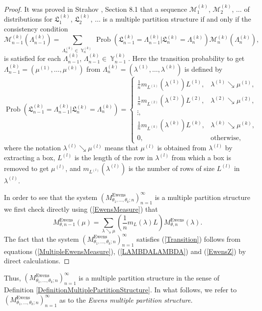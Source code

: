 \documentclass[12pt]{amsart}
\theoremstyle{definition}
\numberwithin{equation}{section}
\DeclareMathOperator{\Prob}{Prob}
\DeclareMathOperator{\Y}{\mathbb{Y}}
\DeclareMathOperator{\Ewens}{Ewens}
\begin{document}
\begin{proof} It was proved in Strahov \cite{StrahovMPS}, Section 8.1
that a sequence $\mathcal{M}_1^{(k)}$, $\mathcal{M}^{(k)}_2$, $\ldots$ of distributions for $\mathfrak{L}_1^{(k)}$, $\mathfrak{L}_2^{(k)}$,
$\ldots$
 is a multiple partition structure if and only if the consistency condition
\begin{equation}\label{Transition}
\mathcal{M}_{n-1}^{(k)}\left(\Lambda_{n-1}^{(k)}\right)=\sum\limits_{\Lambda_n^{(k)}\in\Y_n^{(k)}}
\Prob\left(\mathfrak{L}_{n-1}^{(k)}=\Lambda_{n-1}^{(k)}\biggl\vert\mathfrak{L}_{n}^{(k)}=\Lambda_n^{(k)}\right)\mathcal{M}_n^{(k)}\left(\Lambda_n^{(k)}\right),
\end{equation}
is satisfied for each $\Lambda_{n-1}^{(k)}$, $\Lambda_{n-1}^{(k)}\in\Y_{n-1}^{(k)}$.
Here the transition probability
to get
$\Lambda_{n-1}^{(k)}=\left(\mu^{(1)},\ldots,\mu^{(k)}\right)$ from $\Lambda_n^{(k)}=\left(\lambda^{(1)},\ldots,\lambda^{(k)}\right)$
is defined by
\begin{equation}\label{LAMBDALAMBDA}
\Prob\left(\mathfrak{L}_{n-1}^{(k)}=\Lambda_{n-1}^{(k)}\biggl\vert\mathfrak{L}_{n}^{(k)}=\Lambda_n^{(k)}\right)
=\left\{
  \begin{array}{ll}
    \frac{1}{n}m_{L^{(1)}}(\lambda^{(1)})L^{(1)}, & \lambda^{(1)}\searrow\mu^{(1)}, \\
     \frac{1}{n}m_{L^{(2)}}(\lambda^{(2)})L^{(2)}, & \lambda^{(2)}\searrow\mu^{(2)}, \\
    \vdots, &  \\
     \frac{1}{n}m_{L^{(k)}}(\lambda^{(k)})L^{(k)}, & \lambda^{(k)}\searrow\mu^{(k)}, \\
    0, & \mbox{otherwise},
  \end{array}
\right.
\end{equation}
where the notation $\lambda^{(l)}\searrow\mu^{(l)}$ means that $\mu^{(l)}$ is obtained from $\lambda^{(l)}$ by extracting a box, $L^{(l)}$ is the length of the row in $\lambda^{(l)}$
from which a box is removed to get $\mu^{(l)}$, and $m_{L^{(l)}}\left(\lambda^{(l)}\right)$ is the number of rows of size $L^{(l)}$ in $\lambda^{(l)}$.

In order to see that the system $\left(M_{\theta_1,\ldots,\theta_k;n}^{\Ewens}\right)_{n=1}^{\infty}$ is a multiple partition structure we first check directly using (\ref{EwensMeasure}) that
\begin{equation}\label{EwensZ}
M_{\theta,n-1}^{\Ewens}(\mu)=\sum\limits_{\lambda\searrow\mu}
\left(\frac{1}{n}m_L(\lambda)L\right)M_{\theta,n}^{\Ewens}(\lambda).
\end{equation}
The fact that the system $\left(M_{\theta_1,\ldots,\theta_k;n}^{\Ewens}\right)_{n=1}^{\infty}$ satisfies (\ref{Transition}) follows from equations (\ref{MultipleEwensMeasure}), (\ref{LAMBDALAMBDA})
and (\ref{EwensZ}) by direct calculations.
\end{proof}
Thus, $\left(M_{\theta_1,\ldots,\theta_k;n}^{\Ewens}\right)_{n=1}^{\infty}$
is a multiple partition structure in the sense of Definition
\ref{DefinitionMultiplePartitionStructure}. In what follows, we refer
to $\left(M_{\theta_1,\ldots,\theta_k;n}^{\Ewens}\right)_{n=1}^{\infty}$
as to the \textit{Ewens multiple partition structure.}
\end{document}
